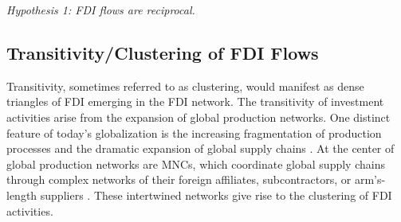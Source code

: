 \documentclass[reqno,onecolumn,letterpaper,12pt]{article}
\begin{document}




\begin{center}
\textit{Hypothesis 1: FDI flows are reciprocal.}
\end{center}


\subsection{Transitivity/Clustering of FDI Flows}
Transitivity, sometimes referred to as clustering, would manifest as dense triangles of FDI emerging in the FDI network. The transitivity of investment activities arise from the expansion of global production networks. One distinct feature of today's globalization is the increasing fragmentation of production processes and the dramatic expansion of global supply chains \citep{UNCTAD:2013,Baldwin:2011}. At the center of global production networks are MNCs, which coordinate global supply chains through complex networks of their foreign affiliates, subcontractors, or arm's-length suppliers \citep[xxii]{UNCTAD:2013}. These intertwined networks give rise to the clustering of FDI activities.
\end{document}
